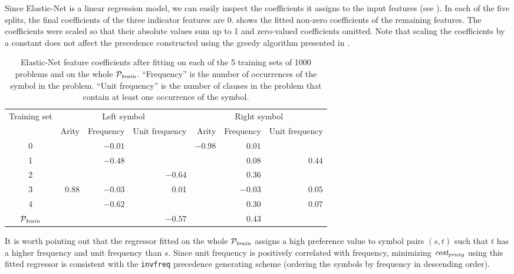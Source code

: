 Since Elastic-Net is a linear regression model, we can easily inspect the coefficients it assigns
to the input features (see ).
In each of the five splits, the final coefficients of the three indicator features are 0.
 shows the fitted non-zero coefficients of the remaining features.
The coefficients were scaled so that their absolute values sum up to 1 and zero-valued coefficients omitted.
Note that scaling the coefficients by a constant does not affect
the precedence constructed using the greedy algorithm presented in .

\begin{table}[ht]
	\centering
	\begin{tabular}{c|rrr|rrr}
		Training set & \multicolumn{3}{c}{Left symbol} & \multicolumn{3}{c}{Right symbol} \\
		& Arity & Frequency & Unit frequency & Arity & Frequency & Unit frequency \\
		\hline
		0 &     &$-0.01$&     &$-0.98$&$ 0.01$&      \\
		1 &     &$-0.48$&     &     &$ 0.08$&$ 0.44 $\\
		2 &     &     &$-0.64$&     &$ 0.36$&      \\
		3 &$ 0.88$&$-0.03$& 0.01&     &$-0.03$&$ 0.05 $\\
		4 &     &$-0.62$&     &     &$ 0.30$&$ 0.07 $\\
		\hline
		\(\mathcal{P}_{\mathit{train}}\) &     &     &$-0.57$&     &$ 0.43$&      \\
	\end{tabular}
	\caption{Elastic-Net feature coefficients after fitting on each of the 5 training sets of 1000 problems and on the whole \(\mathcal{P}_{\mathit{train}}\).
		``Frequency'' is the number of occurrences of the symbol in the problem.
		``Unit frequency'' is the number of clauses in the problem that contain at least one occurrence of the symbol.}
	\label{table:feature-weights}
\end{table}

It is worth pointing out that the regressor fitted on the whole \(\mathcal{P}_{\mathit{train}}\)
assigns a high preference value to symbol pairs \((s, t)\)
such that \(t\) has a higher frequency and unit frequency than \(s\).
Since unit frequency is positively correlated with frequency,
minimizing \(\operatorname{\mathit{cost_{proxy}}}\) using this fitted regressor
is consistent with the \texttt{invfreq} precedence generating scheme
(ordering the symbols by frequency in descending order).


